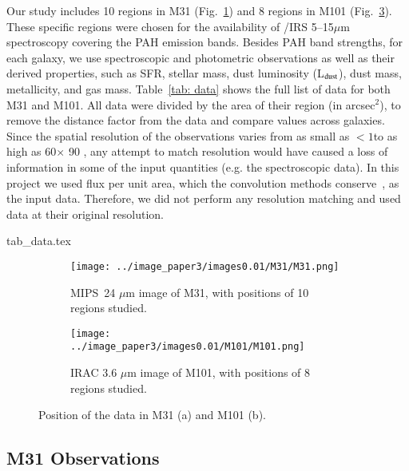 Our study includes 10 regions in M31 (Fig.~\ref{fig: regions in m31}) and 8 regions in M101 (Fig.~\ref{fig: regions in m101}). 
These specific regions were chosen for the availability of \Spitzer/IRS 5--15$\mu$m spectroscopy covering the PAH emission bands.
Besides PAH band strengths, for each galaxy, we use spectroscopic and photometric observations as well as their derived properties, such as SFR, stellar mass, dust luminosity (L$_{\rm dust}$), dust mass, metallicity, and gas mass.
Table~\ref{tab: data} shows the full list of data for both M31 and M101.
All data were divided by the area of their region (in arcsec$^2$), to remove the distance factor from the data and compare values across galaxies.
Since the spatial resolution of the observations varies from as small as $<1$\arcsec to as high as 60\arcsec $\times$ 90 \arcsec, any attempt to match resolution would have caused a loss of information in some of the input quantities (e.g. the spectroscopic data).
In this project we used flux per unit area, which the convolution methods conserve~\citep{Aniano12}, as the input data.
Therefore, we did not perform any resolution matching and used data at their original resolution.

    {tab_data.tex}

    \begin{figure}
  \begin{subfigure}[b]{\textwidth}
        \centering
        \texttt{[image: ../image\_paper3/images0.01/M31/M31.png]}
        \caption{MIPS~24 $\mu$m image of M31, with positions of 10 regions studied.}
        \label{fig: regions in m31}
    \end{subfigure}
    \hfill
    \begin{subfigure}[b]{\textwidth}
        \texttt{[image: ../image\_paper3/images0.01/M101/M101.png]}
        \caption{IRAC 3.6 $\mu$m image of M101, with positions of 8 regions studied.}
    \label{fig: regions in m101}
    \end{subfigure}
    \caption[Position of the data in M31 and M101]{Position of the data in M31 (a) and M101 (b).}
\end{figure}

    \subsection{M31 Observations}
     \label{Sec: data_M31_SOMN} 
     
